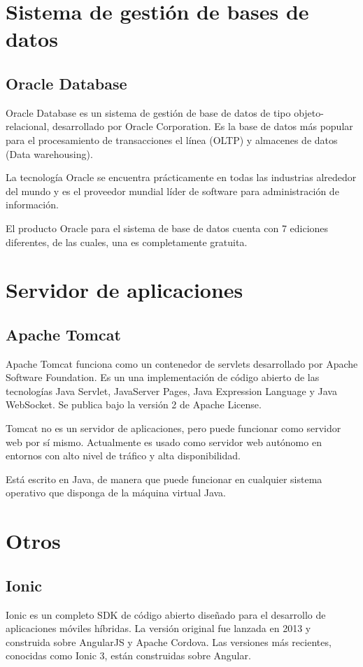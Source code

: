 \section{Sistema de gestión de bases de datos}
\subsection{Oracle Database}
Oracle Database es un sistema de gestión de base de datos de tipo objeto-relacional, desarrollado por Oracle Corporation. Es la base de datos más popular para el procesamiento de transacciones el línea (OLTP) y almacenes de datos (Data warehousing).

La tecnología Oracle se encuentra prácticamente en todas las industrias alrededor del mundo y es el proveedor mundial líder de software para administración de información.

El producto Oracle para el sistema de base de datos cuenta con 7 ediciones diferentes, de las cuales, una es completamente gratuita.

\section{Servidor de aplicaciones}
\subsection{Apache Tomcat}
Apache Tomcat funciona como un contenedor de servlets desarrollado por Apache Software Foundation. Es un una implementación de código abierto de las tecnologías Java Servlet, JavaServer Pages, Java Expression Language y Java WebSocket. Se publica bajo la versión 2 de Apache License.

Tomcat no es un servidor de aplicaciones, pero puede funcionar como servidor web por sí mismo. Actualmente es usado como servidor web autónomo en entornos con alto nivel de tráfico y alta disponibilidad.

Está escrito en Java, de manera que puede funcionar en cualquier sistema operativo que disponga de la máquina virtual Java.



\section{Otros}
\subsection{Ionic}
Ionic es un completo SDK de código abierto diseñado para el desarrollo de aplicaciones móviles híbridas. La versión original fue lanzada en 2013 y construida sobre AngularJS y Apache Cordova. Las versiones más recientes, conocidas como Ionic 3, están construidas sobre Angular.


